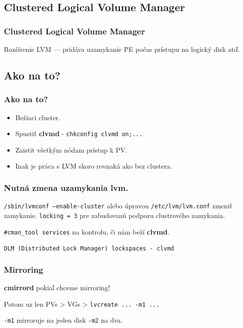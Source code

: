 \documentclass{beamer}
\begin{document}
\subsection{Clustered Logical Volume Manager}

\begin{frame}
\frametitle{Clustered Logical Volume Manager}
Rozšírenie LVM --- pridáva uzamykanie PE počas prístupu na logický disk atď.
\end{frame}
\subsection{Ako na to?}
\begin{frame}
  \frametitle{Ako na to?}
  \begin{itemize}
  \item Bežiaci cluster.
  \item Spustiť \textbf{clvmd} - \texttt{chkconfig clvmd on;...}
  \item Zaistit všetkým nódam prístup k PV.
  \item Inak je práca s LVM skoro rovnaká ako bez clustera.
  \end{itemize}
\end{frame}

\begin{frame}
\frametitle{Nutná zmena uzamykania lvm.}
\texttt{/sbin/lvmconf --enable-cluster}
alebo úpravou \texttt{/etc/lvm/lvm.conf} zmeniť zamykanie.
\texttt{locking = 3} pre zabudovanú podporu clustrového zamykania.
\end{frame}

\begin{frame}
 \texttt{\#cman\_tool services} na kontrolu, či nám beží \textbf{clvmd}.
 
 
 
 \texttt{DLM (Distributed Lock Manager) lockspaces - clvmd}
\end{frame}

\begin{frame}
\frametitle{Mirroring}
\textbf{cmirrord} pokiaľ chceme mirroring!

Potom uz len PVs > VGs > \texttt{lvcreate ... -m1 ...}

\texttt{-m1} mirroruje na jeden disk \texttt{-m2} na dva.
\end{frame}
\end{document}
